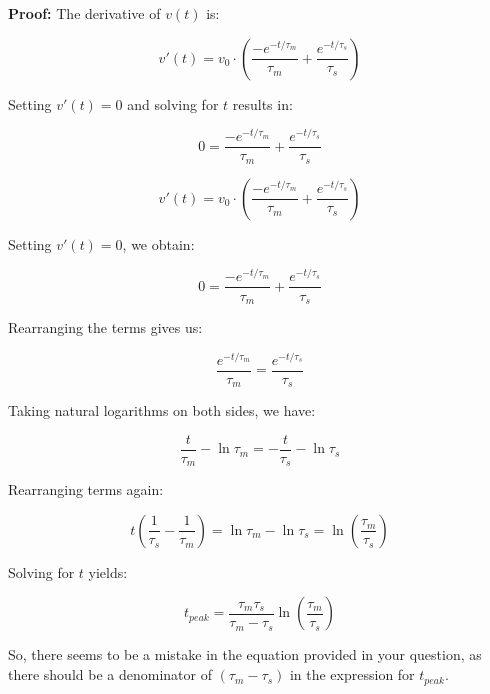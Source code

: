 \textbf{Proof:}
The derivative of $v(t)$ is:

\begin{equation}
v'(t) = v_0 \cdot \left(\frac{-e^{-t/\tau_m}}{\tau_m} + \frac{e^{-t/\tau_s}}{\tau_s}\right)
\end{equation}

Setting $v'(t) = 0$ and solving for $t$ results in:

\begin{equation}
0 = \frac{-e^{-t/\tau_m}}{\tau_m} + \frac{e^{-t/\tau_s}}{\tau_s}
\end{equation}

\begin{equation}
v'(t) = v_0 \cdot \left(\frac{-e^{-t/\tau_m}}{\tau_m} + \frac{e^{-t/\tau_s}}{\tau_s}\right)
\end{equation}

Setting $v'(t) = 0$, we obtain:

\begin{equation}
0 = \frac{-e^{-t/\tau_m}}{\tau_m} + \frac{e^{-t/\tau_s}}{\tau_s}
\end{equation}

Rearranging the terms gives us:

\begin{equation}
\frac{e^{-t/\tau_m}}{\tau_m} = \frac{e^{-t/\tau_s}}{\tau_s}
\end{equation}

Taking natural logarithms on both sides, we have:

\begin{equation}
\frac{t}{\tau_m} - \ln \tau_m = - \frac{t}{\tau_s} - \ln \tau_s
\end{equation}

Rearranging terms again:

\begin{equation}
t \left( \frac{1}{\tau_s} - \frac{1}{\tau_m} \right) = \ln \tau_m - \ln \tau_s = \ln\left(\frac{\tau_m}{\tau_s}\right)
\end{equation}

Solving for $t$ yields:

\begin{equation}
t_{peak} = \frac{\tau_m \tau_s}{\tau_m - \tau_s} \ln\left(\frac{\tau_m}{\tau_s}\right)
\end{equation}

So, there seems to be a mistake in the equation provided in your question, as there should be a denominator of $(\tau_m - \tau_s)$ in the expression for $t_{peak}$.

